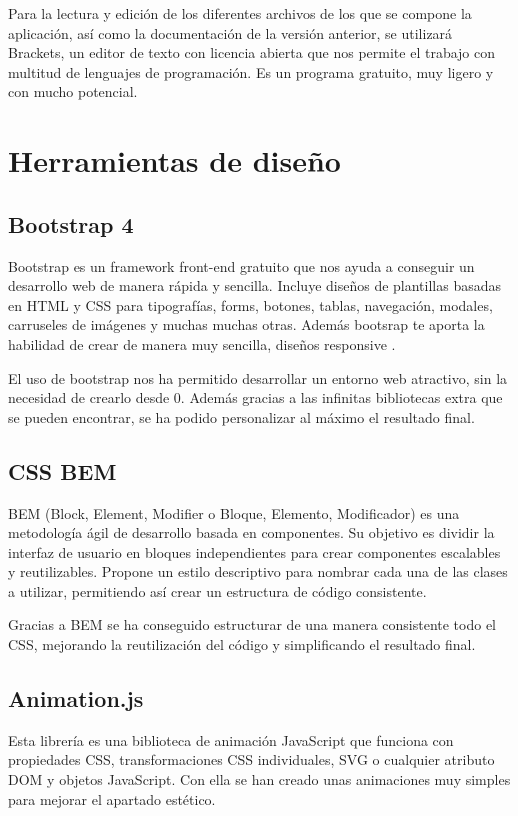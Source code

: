 Para la lectura y edición de los diferentes archivos de los que se compone la aplicación, así como la documentación de la versión anterior, se utilizará Brackets, un editor de texto con licencia abierta que nos permite el trabajo con multitud de lenguajes de programación. Es un programa gratuito, muy ligero y con mucho potencial. 

\section{Herramientas de diseño}

\subsection{Bootstrap 4}

Bootstrap es un framework front-end gratuito que nos ayuda a conseguir un desarrollo web de manera rápida y sencilla. Incluye diseños de plantillas basadas en HTML y CSS para tipografías, forms, botones, tablas, navegación, modales, carruseles de imágenes y muchas muchas otras. Además bootsrap te aporta la habilidad de crear de manera muy sencilla, diseños responsive \cite{Bootstrap}. 

El uso de bootstrap nos ha permitido desarrollar un entorno web atractivo, sin la necesidad de crearlo desde 0. Además gracias a las infinitas bibliotecas extra que se pueden encontrar, se ha podido personalizar al máximo el resultado final.

\subsection{CSS BEM}

BEM (Block, Element, Modifier o Bloque, Elemento, Modificador) es una metodología ágil de desarrollo basada en componentes. Su objetivo es dividir la interfaz de usuario en bloques independientes para crear componentes escalables y reutilizables. Propone un estilo descriptivo para nombrar cada una de las clases a utilizar, permitiendo así crear un estructura de código consistente.

Gracias a BEM se ha conseguido estructurar de una manera consistente todo el CSS, mejorando la reutilización del código y simplificando el resultado final.


\subsection{Animation.js}
Esta librería es una biblioteca de animación JavaScript que funciona con propiedades CSS, transformaciones CSS individuales, SVG o cualquier atributo DOM y objetos JavaScript. Con ella se han creado unas animaciones muy simples para mejorar el apartado estético.

